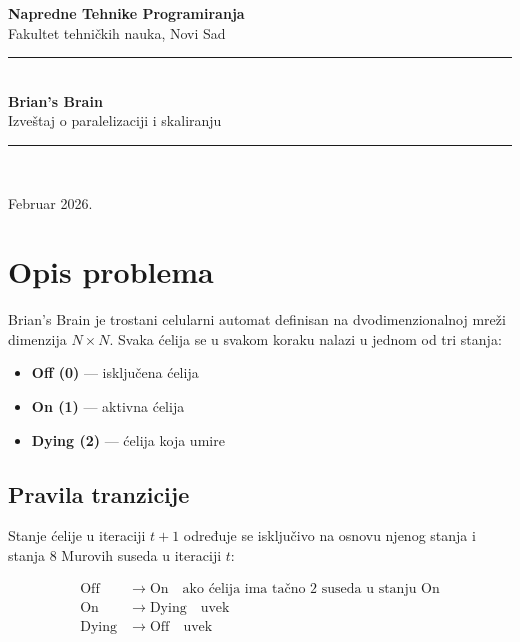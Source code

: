 \documentclass[12pt,a4paper]{article}
\begin{document}
\begin{titlepage}
    \centering
    \vspace*{2cm}

    {\LARGE\bfseries Napredne Tehnike Programiranja}\\[0.5cm]
    {\large Fakultet tehničkih nauka, Novi Sad}\\[2cm]

    \rule{\linewidth}{0.5pt}\\[0.4cm]
    {\Huge\bfseries Brian's Brain}\\[0.3cm]
    {\Large Izveštaj o paralelizaciji i skaliranju}\\[0.2cm]
    \rule{\linewidth}{0.5pt}\\[2cm]

    \vfill

    {\small Februar 2026.}
\end{titlepage}

\tableofcontents
\newpage

\section{Opis problema}

Brian's Brain je trostani celularni automat definisan na dvodimenzionalnoj mreži dimenzija $N \times N$.
Svaka ćelija se u svakom koraku nalazi u jednom od tri stanja:

\begin{itemize}[noitemsep]
    \item \textbf{Off (0)} --- isključena ćelija
    \item \textbf{On (1)} --- aktivna ćelija
    \item \textbf{Dying (2)} --- ćelija koja umire
\end{itemize}

\subsection*{Pravila tranzicije}

Stanje ćelije u iteraciji $t+1$ određuje se isključivo na osnovu njenog stanja i stanja 8
Murovih suseda u iteraciji $t$:

\begin{align}
    \text{Off} &\;\to\; \text{On} \quad\text{ako ćelija ima tačno 2 suseda u stanju On} \\
    \text{On}  &\;\to\; \text{Dying} \quad\text{uvek} \\
    \text{Dying} &\;\to\; \text{Off} \quad\text{uvek}
\end{align}
\end{document}
